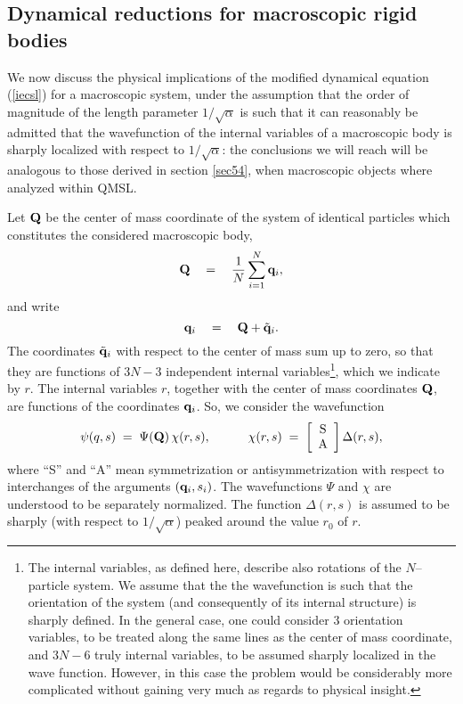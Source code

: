 \documentclass[10pt,a4paper]{article}
\begin{document}
\subsection{Dynamical reductions for macroscopic rigid bodies}
\label{sec72}

We now discuss the physical implications of the modified dynamical
equation (\ref{iecsl}) for a macroscopic system, under the
assumption that the order of magnitude of the length parameter
$1/\sqrt{\alpha}$ is such that it can reasonably be admitted that
the wavefunction of the internal variables of a macroscopic body
is sharply localized with respect to $1/\sqrt{\alpha}$: the
conclusions we will reach will be analogous to those derived in
section \ref{sec54}, when macroscopic objects where analyzed
within QMSL.

Let ${\bf Q}$ be the center  of mass coordinate of the system of
identical particles which constitutes the considered macroscopic
body,
\[
{\bf Q} \quad = \quad \frac{1}{N} \sum_{i=1}^{N} {\bf q}_{i},
\]
and write
\[
{\bf q}_{i} \quad = \quad {\bf Q} + \tilde{\bf q}_{i}.
\]
The coordinates $\tilde{\bf q}_{i}$ with respect to the center of
mass sum up to zero, so that they are functions of $3N - 3$
independent internal variables\footnote{The internal variables, as
defined here, describe also rotations of the $N$--particle system.
We assume that the the wavefunction is such that the orientation
of the system (and consequently of its internal structure) is
sharply defined. In the general case, one could consider $3$
orientation variables, to be treated along the same lines as the
center  of mass coordinate, and $3N - 6$ truly internal variables,
to be assumed sharply localized in the wave function. However, in
this case the problem would be considerably more complicated
without gaining very much as regards to physical insight.}, which
we indicate by $r$. The internal variables $r$, together with the
center of mass coordinates ${\bf Q}$, are functions of the
coordinates ${\bf q}_{i}$.  So, we consider the wavefunction
\begin{equation} \label{wfrb}
\psi (q, s) \; = \; \Psi ({\bf Q})\, \chi (r, s), \qquad \quad
\chi (r, s) \; = \; \left[
\begin{array}{c}
\makebox{S} \\ \makebox{A}
\end{array}
\right] \Delta (r, s),
\end{equation}
where ``S'' and ``A'' mean symmetrization or antisymmetrization
with respect to interchanges of the arguments $({\bf q}_{i},
s_{i})$. The wavefunctions $\Psi$ and $\chi$ are understood to be
separately normalized. The function $\Delta (r, s)$ is assumed to
be sharply (with respect to $1/\sqrt{\alpha}$) peaked around the
value $r_{0}$ of $r$.
\end{document}
